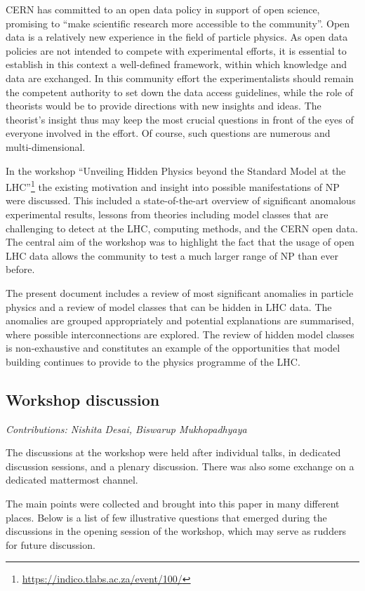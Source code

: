 \documentclass[10pt]{article}
\begin{document}
CERN has committed to an open data policy in support of open science, promising to ``make scientific research more accessible to the community''. %
Open data is a relatively new experience in the field of particle physics.
As open data policies are not intended to compete with experimental efforts, it is essential to establish in this context a well-defined framework, within which knowledge and data are exchanged. 
In this community effort the experimentalists should remain the competent authority to set down the data access guidelines, while the role of theorists would be to provide directions with new insights and ideas.
The theorist's insight thus may keep the most crucial questions in front of the eyes of everyone involved in the effort. Of course, such questions are numerous and multi-dimensional.

In the workshop ``Unveiling Hidden Physics beyond the Standard Model at the LHC''\footnote{\url{https://indico.tlabs.ac.za/event/100/}} the existing motivation and insight into possible manifestations of NP were discussed.
This included a state-of-the-art overview of significant anomalous experimental results, lessons from theories including model classes that are challenging to detect at the LHC, computing methods, and the CERN open data.
The central aim of the workshop was to highlight the fact that the usage of open LHC data allows the community to test a much larger range of NP than ever before.

The present document includes a review of most significant anomalies in particle physics and a review of model classes that can be hidden in LHC data.
The anomalies are grouped appropriately and potential explanations are summarised, where possible interconnections are explored.
The review of hidden model classes is non-exhaustive and constitutes an example of the opportunities that model building continues to provide to the physics programme of the LHC. 


\subsection*{Workshop discussion}
%
{\it\small Contributions: Nishita Desai, Biswarup Mukhopadhyaya}

\medskip\noindent 
The discussions at the workshop were held after individual talks, in dedicated discussion sessions, and a plenary discussion.
There was also some exchange on a dedicated mattermost channel.

The main points were collected and brought into this paper in many different places. 
Below is a list of few illustrative questions that emerged during the discussions in the opening session of the workshop, which may serve as rudders for future discussion.
\end{document}
